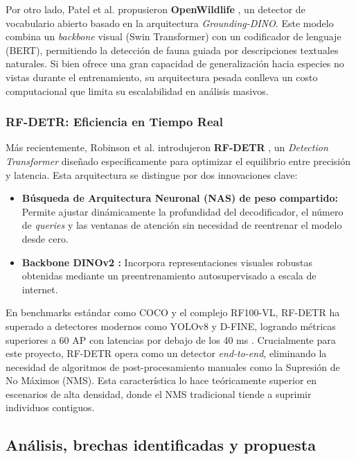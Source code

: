 Por otro lado, Patel et al. propusieron \textbf{OpenWildlife} \cite{open-wildlife}, un detector de vocabulario abierto basado en la arquitectura \textit{Grounding-DINO}. Este modelo combina un \textit{backbone} visual (Swin Transformer) con un codificador de lenguaje (BERT), permitiendo la detección de fauna guiada por descripciones textuales naturales. Si bien ofrece una gran capacidad de generalización hacia especies no vistas durante el entrenamiento, su arquitectura pesada conlleva un costo computacional que limita su escalabilidad en análisis masivos.

\subsubsection*{RF-DETR: Eficiencia en Tiempo Real}
Más recientemente, Robinson et al. introdujeron \textbf{RF-DETR} \cite{rf-detr}, un \textit{Detection Transformer} diseñado específicamente para optimizar el equilibrio entre precisión y latencia. Esta arquitectura se distingue por dos innovaciones clave:

\begin{itemize}
    \item \textbf{Búsqueda de Arquitectura Neuronal (NAS) de peso compartido:} Permite ajustar dinámicamente la profundidad del decodificador, el número de \textit{queries} y las ventanas de atención sin necesidad de reentrenar el modelo desde cero.
    \item \textbf{Backbone DINOv2 \cite{dinov2}:} Incorpora representaciones visuales robustas obtenidas mediante un preentrenamiento autosupervisado a escala de internet.
\end{itemize}

En benchmarks estándar como COCO y el complejo RF100-VL, RF-DETR ha superado a detectores modernos como YOLOv8 y D-FINE, logrando métricas superiores a 60 AP con latencias por debajo de los 40 ms \cite{rf-detr}. Crucialmente para este proyecto, RF-DETR opera como un detector \textit{end-to-end}, eliminando la necesidad de algoritmos de post-procesamiento manuales como la Supresión de No Máximos (NMS). Esta característica lo hace teóricamente superior en escenarios de alta densidad, donde el NMS tradicional tiende a suprimir individuos contiguos.

\subsection{Análisis, brechas identificadas y propuesta}

